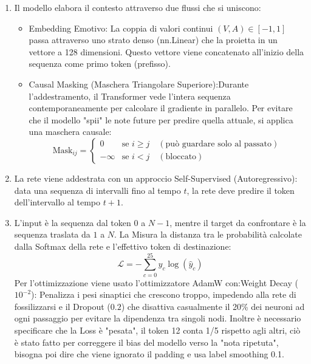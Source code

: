 \begin{enumerate}
    Nel 15\% dei casi di addestramento, i valori di Valenza e Arousal passati alla rete vengono impostati forzatamente a zero [0.0, 0.0].
    Si fa per Costringe il Transformer a imparare prima la struttura della sintassi musicale in modo indipendente ("incondizionato") e solo successivamente a correlarla alle emozioni, evitando che si affidi unicamente all'emozione ignorando la coerenza melodica.
    \item Il modello elabora il contesto attraverso due flussi che si uniscono:
    \begin{itemize}
        \item     Embedding Emotivo: La coppia di valori continui $(V, A) \in [-1, 1]$ passa attraverso uno strato denso (nn.Linear) che la proietta in un vettore a 128 dimensioni. Questo vettore viene concatenato all'inizio della sequenza come primo token (prefisso).
        \item Causal Masking (Maschera Triangolare Superiore):Durante l'addestramento, il Transformer vede l'intera sequenza contemporaneamente per calcolare il gradiente in parallelo. Per evitare che il modello "spii" le note future per predire quella attuale, si applica una maschera causale:
        \[\text{Mask}_{ij} = \begin{cases} 0 & \text{se } i \ge j \quad (\text{può guardare solo al passato}) \\ -\infty & \text{se } i < j \quad (\text{bloccato}) \end{cases}\]
    \end{itemize} 
    \item La rete viene addestrata con un approccio Self-Supervised (Autoregressivo): data una sequenza di intervalli fino al tempo $t$, la rete deve predire il token dell'intervallo al tempo $t+1$.
    \item L'input è la sequenza dal token $0$ a $N-1$, mentre il target da confrontare è la sequenza traslata da $1$ a $N$. La Misura la distanza tra le probabilità calcolate dalla Softmax della rete e l'effettivo token di destinazione:$$\mathcal{L} = -\sum_{c=0}^{25} y_{c} \log(\hat{y}_{c})$$
     Per l'ottimizzazione viene usato l'ottimizzatore AdamW con:Weight Decay ($10^{-2}$): Penalizza i pesi sinaptici che crescono troppo, impedendo alla rete di fossilizzarsi e il Dropout ($0.2$) che disattiva casualmente il 20\% dei neuroni ad ogni passaggio per evitare la dipendenza tra singoli nodi.
     Inoltre è necessario specificare che la Loss è "pesata", il token 12 conta 1/5 rispetto agli altri, ciò è stato fatto per correggere il bias del modello verso la "nota ripetuta", bisogna poi dire che viene ignorato il padding e usa label smoothing 0.1.
    \end{enumerate}
